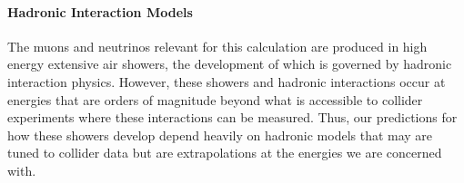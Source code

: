 \paragraph{Hadronic Interaction Models}
The muons and neutrinos relevant for this calculation are produced in high energy extensive air showers, the development of which is governed by hadronic interaction physics.
However, these showers and hadronic interactions occur at energies that are orders of magnitude beyond what is accessible to collider experiments where these interactions can be measured.
Thus, our predictions for how these showers develop depend heavily on hadronic models that may are tuned to collider data but are extrapolations at the energies we are concerned with.

\begin{figure}[h!]
	\centering
	\\[2ex]
\end{figure}
